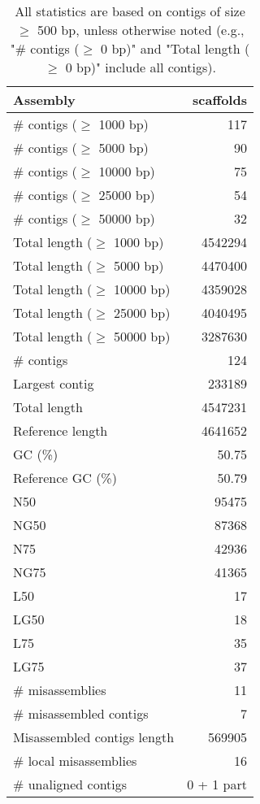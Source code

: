\documentclass[12pt,a4paper]{article}
\begin{document}
\begin{table}[ht]
\begin{center}
\caption{All statistics are based on contigs of size $\geq$ 500 bp, unless otherwise noted (e.g., "\# contigs ($\geq$ 0 bp)" and "Total length ($\geq$ 0 bp)" include all contigs).}
\begin{tabular}{|l*{1}{|r}|}
\hline
Assembly & scaffolds \\ \hline
\# contigs ($\geq$ 1000 bp) & 117 \\ \hline
\# contigs ($\geq$ 5000 bp) & 90 \\ \hline
\# contigs ($\geq$ 10000 bp) & 75 \\ \hline
\# contigs ($\geq$ 25000 bp) & 54 \\ \hline
\# contigs ($\geq$ 50000 bp) & 32 \\ \hline
Total length ($\geq$ 1000 bp) & 4542294 \\ \hline
Total length ($\geq$ 5000 bp) & 4470400 \\ \hline
Total length ($\geq$ 10000 bp) & 4359028 \\ \hline
Total length ($\geq$ 25000 bp) & 4040495 \\ \hline
Total length ($\geq$ 50000 bp) & 3287630 \\ \hline
\# contigs & 124 \\ \hline
Largest contig & 233189 \\ \hline
Total length & 4547231 \\ \hline
Reference length & 4641652 \\ \hline
GC (\%) & 50.75 \\ \hline
Reference GC (\%) & 50.79 \\ \hline
N50 & 95475 \\ \hline
NG50 & 87368 \\ \hline
N75 & 42936 \\ \hline
NG75 & 41365 \\ \hline
L50 & 17 \\ \hline
LG50 & 18 \\ \hline
L75 & 35 \\ \hline
LG75 & 37 \\ \hline
\# misassemblies & 11 \\ \hline
\# misassembled contigs & 7 \\ \hline
Misassembled contigs length & 569905 \\ \hline
\# local misassemblies & 16 \\ \hline
\# unaligned contigs & 0 + 1 part \\ \hline

\end{tabular}
\end{center}
\end{table}
\end{document}
